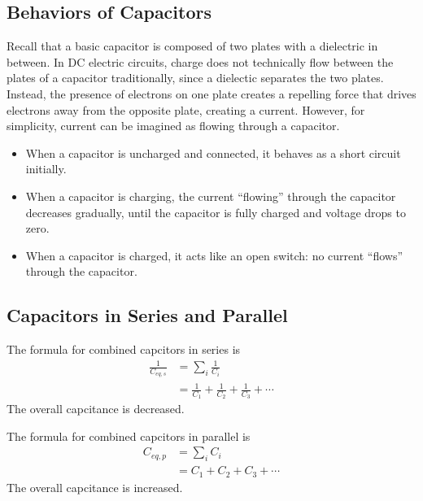 \documentclass[12pt, titlepage]{article}
\begin{document}
\subsection*{Behaviors of Capacitors}
Recall that a basic capacitor is composed of two plates with a dielectric in between. In DC electric circuits, charge does not technically flow between the plates of a capacitor traditionally, since a dielectic separates the two plates. Instead, the presence of electrons on one plate creates a repelling force that drives electrons away from the opposite plate, creating a current. However, for simplicity, current can be imagined as flowing through a capacitor.
\begin{itemize}
    \item When a capacitor is uncharged and connected, it behaves as a short circuit initially.
    \item When a capacitor is charging, the current ``flowing'' through the capacitor decreases gradually, until the capacitor is fully charged and voltage drops to zero.
    \item When a capacitor is charged, it acts like an open switch: no current ``flows'' through the capacitor.
\end{itemize}
\subsection*{Capacitors in Series and Parallel}

The formula for combined capcitors in series is
\begin{align*}
   \frac{1}{C_{eq,s}} &= \sum_{i}\frac{1}{C_{i}} \\
   &= \frac{1}{C_1}+\frac{1}{C_2}+\frac{1}{C_3}+ \cdots
\end{align*}
The overall capcitance is decreased.

The formula for combined capcitors in parallel is
\begin{align*}
   C_{eq,p} &= \sum_{i}C_{i} \\
   &= C_1+C_2+C_3+ \cdots
\end{align*}
The overall capcitance is increased.
\end{document}
